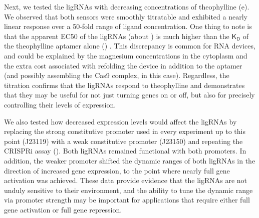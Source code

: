 \documentclass[10pt,oneside]{article}
\begin{document}


Next, we tested the ligRNAs with decreasing concentrations of theophylline (e).  We observed that both sensors were smoothly titratable and exhibited a nearly linear response over a 50-fold range of ligand concentration.  One thing to note is that the apparent EC50 of the ligRNAs (about ) is much higher than the $\mathsf{K_D}$ of the theophylline aptamer alone () \autocite{jenison1994}.  This discrepancy is common for RNA devices, and could be explained by the magnesium concentrations in the cytoplasm \autocite{carothers2010} and the extra cost associated with refolding the device in addition to the aptamer (and possibly assembling the Cas9 complex, in this case).  Regardless, the titration confirms that the ligRNAs respond to theophylline and demonstrates that they may be useful for not just turning genes on or off, but also for precisely controlling their levels of expression.
% 
% 
% 
% 


We also tested how decreased expression levels would affect the ligRNAs by replacing the strong constitutive promoter used in every experiment up to this point (J23119) with a weak constitutive promoter (J23150) and repeating the CRISPRi assay ().  Both ligRNAs remained functional with both promoters.  In addition, the weaker promoter shifted the dynamic ranges of both ligRNAs in the direction of increased gene expression, to the point where nearly full gene activation was achieved.  These data provide evidence that the ligRNAs are not unduly sensitive to their environment, and the ability to tune the dynamic range via promoter strength may be important for applications that require either full gene activation or full gene repression.
\end{document}
